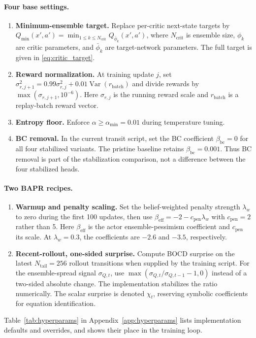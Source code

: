 \documentclass[10pt]{article}
\begin{document}
\paragraph{Four base settings.}
\begin{enumerate}[label=(A\arabic*),leftmargin=2em]
    \item \textbf{Minimum-ensemble target.} Replace per-critic next-state targets by
    $Q_{\min}(x',a')=\min_{1\leq k\leq N_{\mathrm{crit}}}Q_{\bar\phi_k}(x',a')$,
    where $N_{\mathrm{crit}}$ is ensemble size, $\phi_k$ are critic parameters, and $\bar\phi_k$ are target-network parameters. The full target is given in \eqref{eq:critic_target}.
    \item \textbf{Reward normalization.} At training update $j$, set
    $\sigma_{r,j+1}^2=0.99\sigma_{r,j}^2+0.01\operatorname{Var}(r_{\mathrm{batch}})$ and divide rewards by $\max(\sigma_{r,j+1},10^{-6})$. Here $\sigma_{r,j}$ is the running reward scale and $r_{\mathrm{batch}}$ is a replay-batch reward vector.
    \item \textbf{Entropy floor.} Enforce $\alpha\geq\alpha_{\min}=0.01$ during temperature tuning.
    \item \textbf{BC removal.} In the current transit script, set the BC coefficient $\beta_{\mathrm{bc}}=0$ for all four stabilized variants. The pristine baseline retains $\beta_{\mathrm{bc}}=0.001$. Thus BC removal is part of the stabilization comparison, not a difference between the four stabilized heads.
\end{enumerate}

\paragraph{Two BAPR recipes.}
\begin{enumerate}[label=(B\arabic*),leftmargin=2em]
    \item \textbf{Warmup and penalty scaling.} Set the belief-weighted penalty strength $\lambda_w$ to zero during the first 100 updates, then use
    $\beta_{\mathrm{eff}}=-2-c_{\mathrm{pen}}\lambda_w$
    with $c_{\mathrm{pen}}=2$ rather than 5. Here $\beta_{\mathrm{eff}}$ is the actor ensemble-pessimism coefficient and $c_{\mathrm{pen}}$ its scale. At $\lambda_w=0.3$, the coefficients are $-2.6$ and $-3.5$, respectively.
    \item \textbf{Recent-rollout, one-sided surprise.} Compute BOCD surprise on the latest $N_{\mathrm{tail}}=256$ rollout transitions when supplied by the training script. For the ensemble-spread signal $\sigma_{Q,t}$, use
    $\max(\sigma_{Q,t}/\sigma_{Q,t-1}-1,0)$
    instead of a two-sided absolute change. The implementation stabilizes the ratio numerically. The scalar surprise is denoted $\chi_t$, reserving symbolic coefficients for equation identification.
\end{enumerate}
Table~\ref{tab:hyperparams} in Appendix~\ref{app:hyperparams} lists implementation defaults and overrides, and  shows their place in the training loop.
\end{document}

